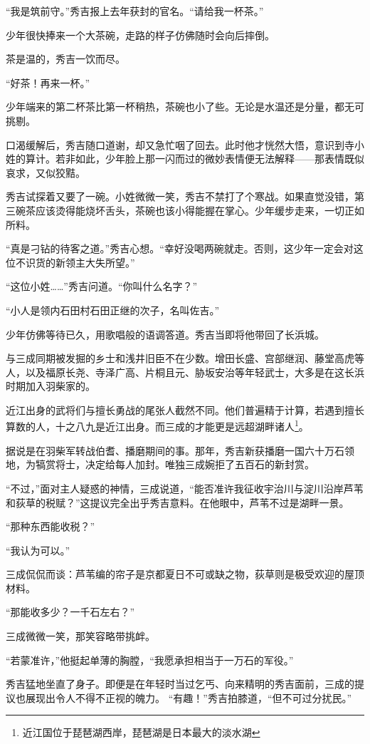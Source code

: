 \documentclass[
]{article}
\begin{document}
``我是筑前守。''秀吉报上去年获封的官名。``请给我一杯茶。''

少年很快捧来一个大茶碗，走路的样子仿佛随时会向后摔倒。

茶是温的，秀吉一饮而尽。

``好茶！再来一杯。''

少年端来的第二杯茶比第一杯稍热，茶碗也小了些。无论是水温还是分量，都无可挑剔。

口渴缓解后，秀吉随口道谢，却又急忙咽了回去。此时他才恍然大悟，意识到寺小姓的算计。若非如此，少年脸上那一闪而过的微妙表情便无法解释------那表情既似哀求，又似狡黠。

秀吉试探着又要了一碗。小姓微微一笑，秀吉不禁打了个寒战。如果直觉没错，第三碗茶应该烫得能烧坏舌头，茶碗也该小得能握在掌心。少年缓步走来，一切正如所料。

``真是刁钻的待客之道。''秀吉心想。``幸好没喝两碗就走。否则，这少年一定会对这位不识货的新领主大失所望。''

``这位小姓\ldots\ldots{}''秀吉问道。``你叫什么名字？''

``小人是领内石田村石田正继的次子，名叫佐吉。''

少年仿佛等待已久，用歌唱般的语调答道。秀吉当即将他带回了长浜城。

与三成同期被发掘的乡士和浅井旧臣不在少数。增田长盛、宫部继润、藤堂高虎等人，以及福原长尧、寺泽广高、片桐且元、胁坂安治等年轻武士，大多是在这长浜时期加入羽柴家的。

近江出身的武将们与擅长勇战的尾张人截然不同。他们普遍精于计算，若遇到擅长算数的人，十之八九是近江出身。而三成的才能更是远超湖畔诸人\footnote{近江国位于琵琶湖西岸，琵琶湖是日本最大的淡水湖}。

据说是在羽柴军转战伯耆、播磨期间的事。那年，秀吉新获播磨一国六十万石领地，为犒赏将士，决定给每人加封。唯独三成婉拒了五百石的新封赏。

``不过，''面对主人疑惑的神情，三成说道，``能否准许我征收宇治川与淀川沿岸芦苇和荻草的税赋？''这提议完全出乎秀吉意料。在他眼中，芦苇不过是湖畔一景。

``那种东西能收税？''

``我认为可以。''

三成侃侃而谈：芦苇编的帘子是京都夏日不可或缺之物，荻草则是极受欢迎的屋顶材料。

``那能收多少？一千石左右？''

三成微微一笑，那笑容略带挑衅。

``若蒙准许，''他挺起单薄的胸膛，``我愿承担相当于一万石的军役。''

秀吉猛地坐直了身子。即便是在年轻时当过乞丐、向来精明的秀吉面前，三成的提议也展现出令人不得不正视的魄力。
``有趣！''秀吉拍膝道，``但不可过分扰民。''
\end{document}

